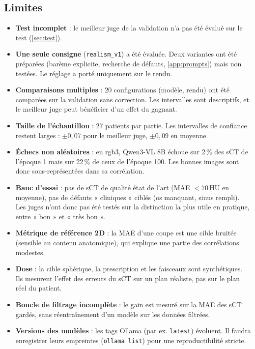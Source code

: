 \documentclass[11pt,a4paper]{article}
\begin{document}
\subsection{Limites}
\label{sec:limites}
\begin{itemize}
  \item \textbf{Test incomplet} : le meilleur juge de la validation n'a pas été évalué sur le test (\cref{sec:test}).
  \item \textbf{Une seule consigne} (\texttt{realism\_v1}) a été évaluée. Deux variantes ont été préparées (barème explicite, recherche de défauts, \cref{app:prompts}) mais non testées. Le réglage a porté uniquement sur le rendu.
  \item \textbf{Comparaisons multiples} : 20 configurations (modèle, rendu) ont été comparées sur la validation sans correction. Les intervalles sont descriptifs, et le meilleur juge peut bénéficier d'un effet du gagnant.
  \item \textbf{Taille de l'échantillon} : 27 patients par partie. Les intervalles de confiance restent larges : $\pm 0{,}07$ pour le meilleur juge, $\pm 0{,}09$ en moyenne.
  \item \textbf{Échecs non aléatoires} : en rgb3, Qwen3-VL 8B échoue sur 2\,\% des sCT de l'époque 1 mais sur 22\,\% de ceux de l'époque 100. Les bonnes images sont donc sous-représentées dans sa corrélation.
  \item \textbf{Banc d'essai} : pas de sCT de qualité état de l'art (MAE $< 70$\,HU en moyenne), pas de défauts « cliniques » ciblés (os manquant, sinus rempli). Les juges n'ont donc pas été testés sur la distinction la plus utile en pratique, entre « bon » et « très bon ».
  \item \textbf{Métrique de référence 2D} : la MAE d'une coupe est une cible bruitée (sensible au contenu anatomique), qui explique une partie des corrélations modestes.
  \item \textbf{Dose} : la cible sphérique, la prescription et les faisceaux sont synthétiques. Ils mesurent l'effet des erreurs du sCT sur un plan réaliste, pas sur le plan réel du patient.
  \item \textbf{Boucle de filtrage incomplète} : le gain est mesuré sur la MAE des sCT gardés, sans réentraînement d'un modèle sur les données filtrées.
  \item \textbf{Versions des modèles} : les tags Ollama (par ex. \texttt{latest}) évoluent. Il faudra enregistrer leurs empreintes (\texttt{ollama list}) pour une reproductibilité stricte.
\end{itemize}
\end{document}
